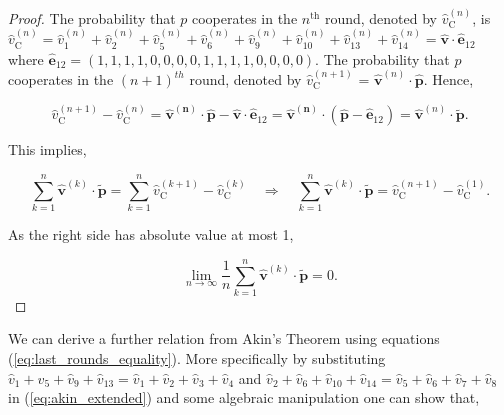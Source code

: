 \documentclass{article}
\theoremstyle{definition}
\begin{document}
\begin{proof}
  The probability that \(p\) cooperates in the \(n^{\text{th}}\) round, denoted
  by \(\hat{v}_{\text{C}}^{(n)}\), is \(\hat{v}_{\text{C}}^{(n)} = \hat{v}_{1}^{(n)} +
  \hat{v}_{2}^{(n)} + \hat{v}_{5}^{(n)} + \hat{v}_{6}^{(n)} + \hat{v}_{9}^{(n)} +  \hat{v}_{10}^{(n)} +
  \hat{v}_{13}^{(n)} + \hat{v}_{14}^{(n)} = \mathbf{\hat{v}} \cdot \mathbf{\hat{e}}_{1 2}\)
  where \(\mathbf{\hat{e}}_{1 2} = (1, 1, 1, 1, \allowbreak 0,
  0, 0, 0, 1, 1, 1, 1, 0, 0, 0, 0)\). The probability that \(p\) cooperates in the \((n + 1)^{th}\) round, denoted
  by \(\hat{v}_{\text{C}}^{(n + 1)}\) = \(\mathbf{\hat{v}}^{(n)} \cdot \mathbf{\hat{p}}\).
  Hence,

  \begin{equation*}
   \hat{v}_{\text{C}}^{(n + 1)} - \hat{v}_{\text{C}}^{(n)} = \mathbf{\hat{v}^{(n)}} \cdot \mathbf{\hat{p}} - \mathbf{\hat{v}} \cdot \mathbf{\hat{e}}_{1 2}
    = \mathbf{\hat{v}^{(n)}} \cdot (\mathbf{\hat{p}} - \mathbf{\hat{e}}_{1 2}) = \mathbf{\hat{v}}^{(n)} \cdot \mathbf{\tilde{p}}.
  \end{equation*}

  This implies,

  \begin{equation}
    \sum^{n}_{k=1} \mathbf{\hat{v}}^{(k)} \cdot \mathbf{\tilde{p}} = \sum^{n}_{k=1} \hat{v}_{\text{C}}^{(k + 1)} - \hat{v}_{\text{C}}^{(k)} \quad \Rightarrow \quad \sum^{n}_{k=1} \mathbf{\hat{v}}^{(k)} \cdot \mathbf{\tilde{p}} =  \hat{v}_{\text{C}}^{(n + 1)} - \hat{v}_{\text{C}}^{(1)}.
   \end{equation}

   As the right side has absolute value at most 1,

   \begin{equation}
    \lim_{n \rightarrow \infty} \frac{1}{n} \sum^{n}_{k=1} \mathbf{\hat{v}}^{(k)} \cdot \mathbf{\tilde{p}} = 0. 
   \end{equation}

\end{proof}

We can derive a further relation from Akin's Theorem using equations
(\ref{eq:last_rounds_equality}). More specifically by substituting \(\hat{v}_{1} +
\hat{v}_{5} + \hat{v}_{9} + \hat{v}_{13} = \hat{v}_{1} +
\hat{v}_{2} + \hat{v}_{3} + \hat{v}_{4} \) and \(\hat{v}_{2} + \hat{v}_{6} + \hat{v}_{10} + \hat{v}_{14} =
\hat{v}_{5} + \hat{v}_{6} + \hat{v}_{7} + \hat{v}_{8} \) in (\ref{eq:akin_extended}) and some
algebraic manipulation one can show that,
\end{document}
